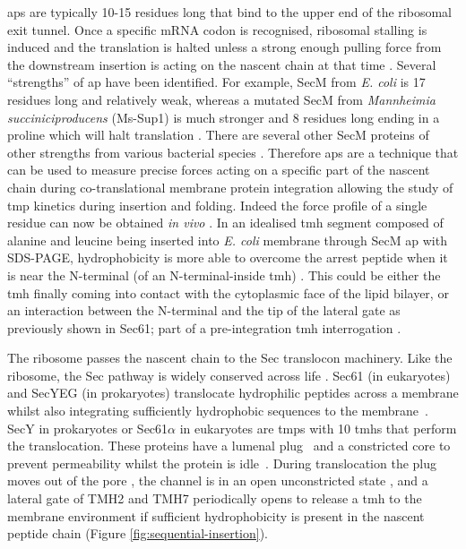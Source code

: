 \gls{ap}s are typically 10-15 residues long that bind to the upper end of the ribosomal exit tunnel.
Once a specific mRNA codon is recognised, ribosomal stalling is induced \cite{Ito2010} and the translation is halted unless a strong enough pulling force from the downstream insertion is acting on the nascent chain at that time \cite{Butkus2003}.
Several ``strengths'' of \gls{ap} have been identified.
For example, SecM from \textit{E. coli} is 17 residues long and relatively weak, whereas a mutated SecM from \textit{Mannheimia succiniciproducens} (Ms-Sup1) is much stronger and 8 residues long ending in a proline which will halt translation \cite{Ismail2012}.
There are several other SecM proteins of other strengths from various bacterial species \cite{Yap2009}.
Therefore \gls{ap}s are a technique that can be used to measure precise forces acting on a specific part of the nascent chain during co-translational membrane protein integration allowing the study of \gls{tmp} kinetics during insertion and folding.
Indeed the force profile of a single residue can now be obtained \textit{in vivo} \cite{Ismail2012}.
In an idealised \gls{tmh} segment composed of alanine and leucine being inserted into \textit{E. coli} membrane through SecM \gls{ap} with SDS-PAGE, hydrophobicity is more able to overcome the arrest peptide when it is near the N\--terminal (of an N\--terminal-inside \gls{tmh}) \cite{Ismail2012}.
This could be either the \gls{tmh} finally coming into contact with the cytoplasmic face of the lipid bilayer, or an interaction between the N\--terminal and the tip of the lateral gate as previously shown in Sec61; part of a pre-integration \gls{tmh} interrogation \cite{MacKinnon2014}.

The ribosome passes the nascent chain to the Sec translocon machinery.
Like the ribosome, the Sec pathway is widely conserved across life \cite{Cao2003}.
Sec61 (in eukaryotes) and SecYEG (in prokaryotes) translocate hydrophilic peptides across a membrane whilst also integrating sufficiently hydrophobic sequences to the membrane~\cite{Junne2010, Park2012, Shao2011, Cymer2015}.
SecY in prokaryotes or Sec61$\alpha$ in eukaryotes are \gls{tmp}s with 10 \gls{tmh}s that perform the translocation.
These proteins have a lumenal plug~\cite{Tam2005, Junne2006} and a constricted core to prevent permeability whilst the protein is idle~\cite{Junne2010}.
During translocation the plug moves out of the pore \cite{Li2016}, the channel is in an open unconstricted state \cite{Junne2010}, and a lateral gate of TMH2 and TMH7 \cite{VandenBerg2004} periodically opens to release a \gls{tmh} to the membrane environment if sufficient hydrophobicity is present in the nascent peptide chain \cite{Niesen2018, Junne2010, Egea2010}(Figure \ref{fig:sequential-insertion}).



